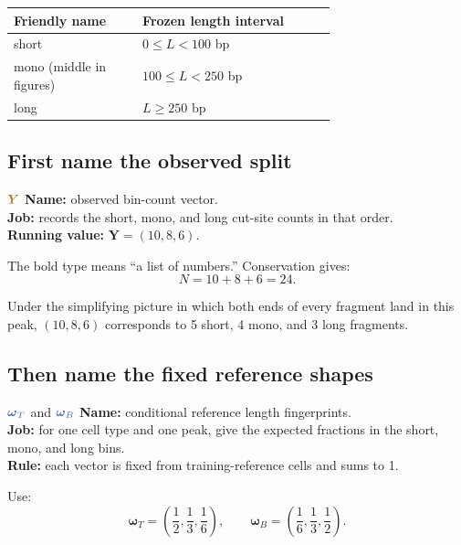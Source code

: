 \documentclass[11pt]{article}
\newcommand{\fixedq}[1]{\textcolor{fixedblue!75!black}{#1}}
\newcommand{\obsq}[1]{\textcolor{observedgold!80!black}{#1}}
\begin{document}
\begin{center}
\begin{tabular}{L{0.28\linewidth}L{0.42\linewidth}}
\toprule
Friendly name & Frozen length interval \\
\midrule
short & \(0\le L<100\) bp \\
mono (middle in figures) & \(100\le L<250\) bp \\
long & \(L\ge250\) bp \\
\bottomrule
\end{tabular}
\end{center}

\subsection{First name the observed split}

\begin{newvar}{\(\obsq{\boldsymbol{Y}}\)}
\textbf{Name:} observed bin-count vector.\\
\textbf{Job:} records the short, mono, and long cut-site counts in that order.\\
\textbf{Running value:} \(\boldsymbol{Y}=(10,8,6)\).
\end{newvar}

The bold type means “a list of numbers.” Conservation gives:
\[
N=10+8+6=24.
\]

Under the simplifying picture in which both ends of every fragment land in this
peak, \((10,8,6)\) corresponds to 5 short, 4 mono, and 3 long fragments.

\subsection{Then name the fixed reference shapes}

\begin{newvar}{\(\fixedq{\boldsymbol{\omega}_T}\) and \(\fixedq{\boldsymbol{\omega}_B}\)}
\textbf{Name:} conditional reference length fingerprints.\\
\textbf{Job:} for one cell type and one peak, give the expected fractions in the
short, mono, and long bins.\\
\textbf{Rule:} each vector is fixed from training-reference cells and sums to 1.
\end{newvar}

Use:
\[
\boldsymbol{\omega}_T=
\left(\frac12,\frac13,\frac16\right),
\qquad
\boldsymbol{\omega}_B=
\left(\frac16,\frac13,\frac12\right).
\]
\end{document}

